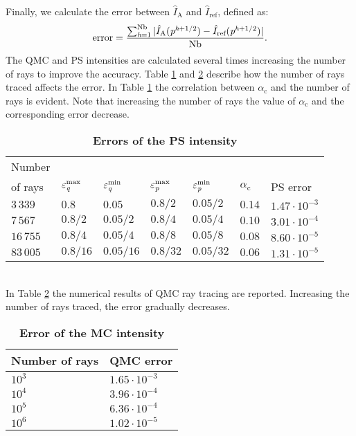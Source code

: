 Finally, we calculate the error between $\hat{I}_{\textrm{A}}$ and $\hat{I}_{\textrm{ref}}$, defined as:
\begin{equation}\label{eq:error}
\mbox{error} = \frac{\sum_{\textit{h}= 1}^{\textrm{Nb}}| \hat{I}_{\textrm{A}}(\textit{p}^{\textit{h}+1/2}) - \hat{I}_{\textrm{ref}}(\textit{p}^{\textit{h}+1/2})|}{\textrm{Nb}}.
\end{equation}
The QMC and PS intensities are calculated several times increasing the number of rays to improve the accuracy.
Table \ref{tab:table} and \ref{tab:table2} describe how the number of rays traced affects the error. 
In Table \ref{tab:table} the correlation between $\alpha_\textrm{c}$ and the number of rays is evident.
Note that increasing the number of rays the value of $\alpha_\textrm{c}$ and the corresponding error decrease. 
\begin{table}[htbp] \label{tab:table}
\centering
\caption{\bf Errors of the PS intensity}
\begin{tabular}{lllllll}
 \hline  Number \\ of rays\;  & $\varepsilon^{\textrm{max}}_{\textit{q}} $  & $\varepsilon^{\textrm{min}}_{\textit{q}} $   \;     & $\varepsilon^{\textrm{max}}_{\textit{p}}$\;
  & $\varepsilon^{\textrm{min}}_{\textit{p}}$\; & $\alpha_\textrm{c}$  & PS error \\
  \hline 
 $3\,339$ & $0.8$  & $0.05$  & $0.8/2$  & $0.05/2$ & $0.14$ & $1.47\cdot10^{-3}$ \\
$7\,567$  & $0.8/2$  & $0.05/2$  & $0.8/4$  & $0.05/4$ & $0.10$ & $3.01\cdot 10^{-4}$  \\
$16\,755$  & $0.8/4$  & $0.05/4$  & $0.8/8$  & $0.05/8$ & $0.08$ & $8.60\cdot 10^{-5}$ \\
 $83\,005$ & $0.8/16$  & $0.05/16$  & $0.8/32$  & $0.05/32$ & $0.06$ & $1.31\cdot 10^{-5}$ \\
 \hline
 \end{tabular}
 \label{tab:table}
 \end{table}
\\ \indent In Table \ref{tab:table2} the numerical results of QMC ray tracing are reported.
Increasing the number of rays traced, the error gradually decreases.
\begin{table}[htbp]
\centering
\caption{\bf Error of the MC intensity}
\begin{tabular}{ll} \hline   Number of rays\; & QMC error\\
 \hline $10^3$  & $1.65\cdot10^{-3}$ \\
$10^4$  & $3.96\cdot 10^{-4}$  \\
 $10^5$  & $6.36\cdot 10^{-4}$ \\ 
$10^6$  & $1.02\cdot 10^{-5}$ \\
 \hline
 \end{tabular}
 \label{tab:table2}
 \end{table}
